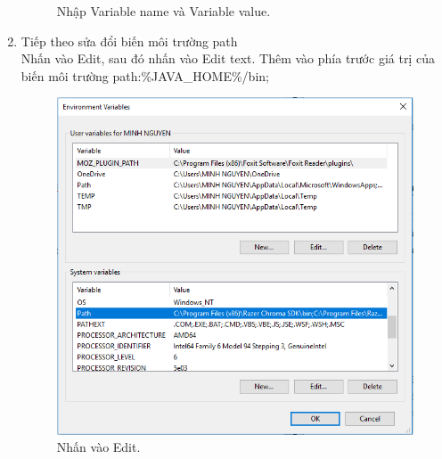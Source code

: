 \begin{enumerate}
\begin{center}
\begin{figure}[htp]
\begin{center}
    \end{center}
    \caption{Nhập Variable name và Variable value.}
    \label{refhinh1}
    \end{figure}
\end{center}
    \item Tiếp theo sửa đổi biến môi trường path\\
    Nhấn vào Edit, sau đó nhấn vào Edit text. Thêm vào phía trước giá trị của biến môi trường path:\textsf{\%JAVA\_HOME\%/bin;}
\begin{center}
    \begin{figure}[htp]
    \begin{center}
     \includegraphics[scale=0.5]{image3/edit}
    \end{center}
    \caption{Nhấn vào Edit.}
    \label{refhinh1}
    \end{figure}
\end{center}
\newpage
\begin{center}
    \begin{figure}[htp]
    \begin{center}

\end{center}
\end{figure}
\end{center}
\end{enumerate}
